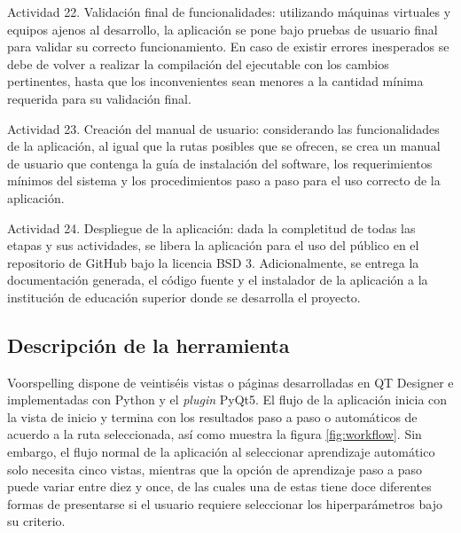 \begin{APAitemize}
    \item Actividad 22. Validación final de funcionalidades: utilizando máquinas virtuales y equipos ajenos al desarrollo, la aplicación se pone bajo pruebas de usuario final para validar su correcto funcionamiento. En caso de existir errores inesperados se debe de volver a realizar la compilación del ejecutable con los cambios pertinentes, hasta que los inconvenientes sean menores a la cantidad mínima requerida para su validación final.
    \item Actividad 23. Creación del manual de usuario: considerando las funcionalidades de la aplicación, al igual que la rutas posibles que se ofrecen, se crea un manual de usuario que contenga la guía de instalación del software, los requerimientos mínimos del sistema y los procedimientos paso a paso para el uso correcto de la aplicación.
    \item Actividad 24. Despliegue de la aplicación: dada la completitud de todas las etapas y sus actividades, se libera la aplicación para el uso del público en el repositorio de GitHub bajo la licencia BSD 3. Adicionalmente, se entrega la documentación generada, el código fuente y el instalador de la aplicación a la institución de educación superior donde se desarrolla el proyecto.
\end{APAitemize}

\subsection{Descripción de la herramienta}

Voorspelling dispone de veintiséis vistas o páginas desarrolladas en QT Designer e implementadas con Python y el \textit{plugin} PyQt5. El flujo de la aplicación inicia con la vista de inicio y termina con los resultados paso a paso o automáticos de acuerdo a la ruta seleccionada, así como muestra la figura \ref{fig:workflow}. Sin embargo, el flujo normal de la aplicación al seleccionar aprendizaje automático solo necesita cinco vistas, mientras que la opción de aprendizaje paso a paso puede variar entre diez y once, de las cuales una de estas tiene doce diferentes formas de presentarse si el usuario requiere seleccionar los hiperparámetros bajo su criterio.

